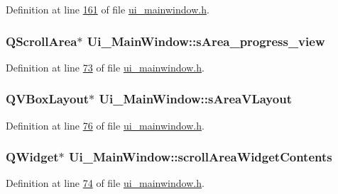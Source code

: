 Definition at line \hyperlink{a00052_source_l00161}{161} of file \hyperlink{a00052_source}{ui\+\_\+mainwindow.\+h}.

\hypertarget{a00027_ae4fe44aa026dd0e84e0f10cdcabca504}{
\subsubsection[{s\+Area\+\_\+progress\+\_\+view}]{\setlength{\rightskip}{0pt plus 5cm}Q\+Scroll\+Area$\ast$ Ui\+\_\+\+Main\+Window\+::s\+Area\+\_\+progress\+\_\+view}}\label{a00027_ae4fe44aa026dd0e84e0f10cdcabca504}


Definition at line \hyperlink{a00052_source_l00073}{73} of file \hyperlink{a00052_source}{ui\+\_\+mainwindow.\+h}.

\hypertarget{a00027_a2bdce9ad313cd4ee575613f36cbc4678}{
\subsubsection[{s\+Area\+V\+Layout}]{\setlength{\rightskip}{0pt plus 5cm}Q\+V\+Box\+Layout$\ast$ Ui\+\_\+\+Main\+Window\+::s\+Area\+V\+Layout}}\label{a00027_a2bdce9ad313cd4ee575613f36cbc4678}


Definition at line \hyperlink{a00052_source_l00076}{76} of file \hyperlink{a00052_source}{ui\+\_\+mainwindow.\+h}.

\hypertarget{a00027_aa70fc2af9f9ea3b686db12823c5deb47}{
\subsubsection[{scroll\+Area\+Widget\+Contents}]{\setlength{\rightskip}{0pt plus 5cm}Q\+Widget$\ast$ Ui\+\_\+\+Main\+Window\+::scroll\+Area\+Widget\+Contents}}\label{a00027_aa70fc2af9f9ea3b686db12823c5deb47}


Definition at line \hyperlink{a00052_source_l00074}{74} of file \hyperlink{a00052_source}{ui\+\_\+mainwindow.\+h}.

